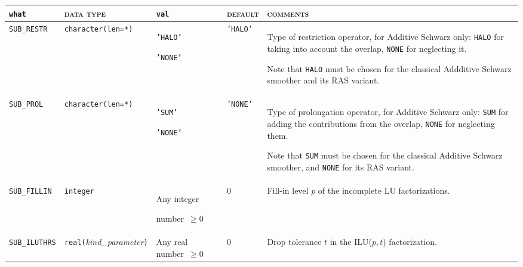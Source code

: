 \bsideways
\begin{center}
\small
\begin{tabular}{|p{3cm}|l|p{2.5cm}|p{2.2cm}|p{7.1cm}|}
\hline
\verb|what|              & \textsc{data type}        &  \verb|val|      &  \textsc{default}  &
\textsc{comments} \\ \hline
\verb|SUB_RESTR|   & \verb|character(len=*)|
                         & \texttt{'HALO'} \par \texttt{'NONE'}
                         & \texttt{'HALO'}
                         & Type of restriction operator,  for Additive Schwarz only:
                           \texttt{HALO} for taking into account the overlap, \texttt{NONE} 
                           for neglecting it. \par
                           Note that \texttt{HALO} must be chosen for
                          the classical Addditive Schwarz smoother and its RAS variant.\\ \hline
\verb|SUB_PROL|   & \verb|character(len=*)|
                         & \texttt{'SUM'} \par \texttt{'NONE'}
                         & \texttt{'NONE'}
                         & Type of prolongation operator, for Additive Schwarz only:
                           \texttt{SUM} for adding the contributions from the overlap, \texttt{NONE}
                           for neglecting them.   \par
                          Note that \texttt{SUM} must be chosen for the classical Additive
                          Schwarz smoother, and \texttt{NONE} for its RAS variant. \\ \hline
\verb|SUB_FILLIN|  & \verb|integer|
                         & Any integer \par number~$\ge 0$
                         & 0
                         & Fill-in level $p$ of the incomplete LU factorizations. \\ \hline
\verb|SUB_ILUTHRS|  & \verb|real(|\emph{kind\_parameter}\verb|)|
                         & Any real number~$\ge 0$
                         & 0
                         & Drop tolerance $t$ in the ILU($p,t$) factorization. \\ %

\end{tabular}
\end{center}
